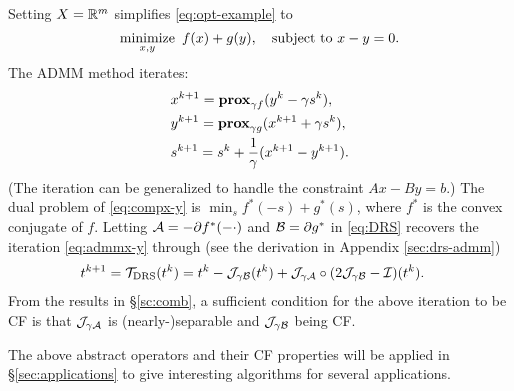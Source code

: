 {\DIFdelbegin %
\DIFdelend \DIFaddbegin \begin{example}\DIFaddend \label{alg:admm} Setting $X=\mathbb{R}^m$ simplifies \eqref{eq:opt-example} to
\begin{equation}\label{eq:compx-y}
\Min_{x,y}~f(x)+g(y),\quad\St~ x-y=0.
\end{equation}
The ADMM method iterates:
\begin{subequations}\label{eq:admmx-y}
\begin{align}
&x^{k+1}=\prox_{\gamma f}(y^k-\gamma s^k),\\%
&y^{k+1}=\prox_{\gamma g}(x^{k+1}+\gamma s^{k}),\\%
&s^{k+1}=s^k+\frac{1}{\gamma}(x^{k+1}-y^{k+1}).
\end{align}
\end{subequations}
(The iteration can be generalized to handle the constraint $Ax-By=b$.) The dual problem of \eqref{eq:compx-y} is $\min_s f^*(-s)+g^*(s)$, where $f^*$ is the convex conjugate of $f$. Letting ${\mathcal{A}}=-\partial f^*(-\cdot)$ and ${\mathcal{B}}=\partial g^*$ in \eqref{eq:DRS} recovers the iteration  \eqref{eq:admmx-y} through (see the derivation in Appendix \ref{sec:drs-admm})
\begin{align*}
&t^{k+1}=\TDRS(t^k)=t^k-\cJ_{\gamma \cB}(t^k)+\cJ_{\gamma\cA}\circ(2\cJ_{\gamma \cB}-\cI)(t^k).
\end{align*}  %
From the results in \S\ref{sc:comb}, a sufficient condition for the above iteration to be CF is that ${\mathcal{J}}_{\gamma{\mathcal{A}}}$ is (nearly-)separable and ${\mathcal{J}}_{\gamma{\mathcal{B}}}$ being CF.
\end{example}

The above abstract operators and their CF properties will be applied in \S\ref{sec:applications} to give interesting algorithms for several applications.


}

